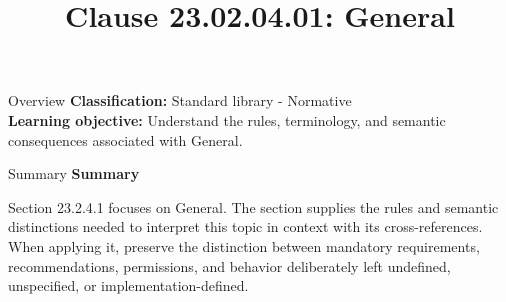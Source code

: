 \documentclass[10pt,letterpaper]{article}
\title{Clause 23.02.04.01: General}
\author{}
\date{}
\begin{document}
\maketitle
\begin{CornellOverviewBox}{Overview}
\textbf{Classification:} Standard library - Normative\\[2pt]
\textbf{Learning objective:} Understand the rules, terminology, and semantic consequences associated with General.
\end{CornellOverviewBox}\begin{CornellSummaryBox}{Summary}
{\sffamily\bfseries\color{Accent} Summary}\par\vspace{3pt}Section 23.2.4.1 focuses on General. The section supplies the rules and semantic distinctions needed to interpret this topic in context with its cross-references. When applying it, preserve the distinction between mandatory requirements, recommendations, permissions, and behavior deliberately left undefined, unspecified, or implementation-defined.
\end{CornellSummaryBox}
\end{document}
